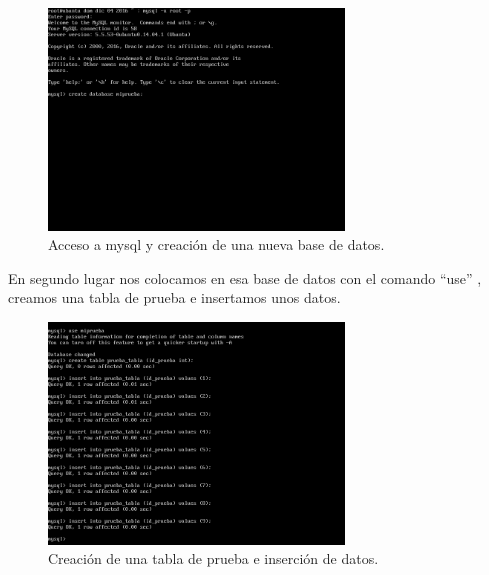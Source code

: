 \begin{figure}[H]
	\begin{center}
		\includegraphics[width=0.7\textwidth]{Imagenes/Acceso_mysql_y_creacion_base_datos}
		\caption{Acceso a mysql y creación de una nueva base de datos.} \label{fig:27}
	\end{center}
\end{figure}

En segundo lugar nos colocamos en esa base de datos con el comando ``use'' , creamos una tabla \cite{CREARTABLAmysql} de prueba e insertamos unos datos. \cite{INSERTARDATOSmysql}

\begin{figure}[H]
	\begin{center}
		\includegraphics[width=0.7\textwidth]{Imagenes/Seleccion_basedatos_insercion_datos}
		\caption{Creación de una tabla de prueba e inserción de datos.} \label{fig:28}
	\end{center}
\end{figure}

